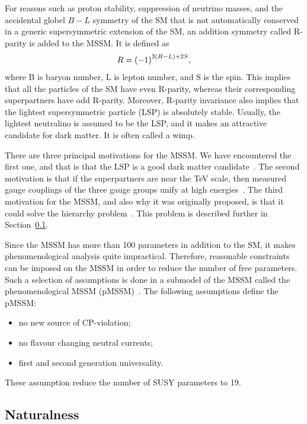 For reasons such as proton stability, suppression of neutrino masses, and the accidental globel $B-L$ symmetry of the SM that is not automatically conserved in a generic supersymmetric extension of the SM, an addition symmetry called R-parity is added to the MSSM. It is defined as
\begin{equation}
R=\qty(-1)^{3(B-L)+2S},
\end{equation}
where B is baryon number, L is lepton number, and S is the spin. This implies that all the particles of the SM have even R-parity, whereas their corresponding superpartners have odd R-parity. Moreover,
R-parity invariance also implies that the lightest supersymmetric particle (LSP) is absolutely stable. Usually, the lightest neutralino is assumed to be the LSP, and it makes an attractive candidate for dark matter. It is often called a \gls{wimp}.

There are three principal motivations for the MSSM. We have encountered the first one, and that is that the LSP is a good dark matter candidate~\cite{Garrett_2011}. The second motivation is that if the superpartners are near the TeV scale, then measured gauge couplings of the three gauge groups unify at high energies~\cite{PhysRevD.24.1681}. The third motivation for the MSSM, and also why it was originally proposed, is that it could solve the hierarchy problem~\cite{DIMOPOULOS1981150}. This problem is described further in Section~\ref{sec:naturalness}.

Since the MSSM has more than 100 parameters in addition to the SM, it makes phenomenological analysis quite impractical. Therefore, reasonable constraints can be imposed on the MSSM in order to reduce the number of free parameters. Such a selection of assumptions is done in a submodel of the MSSM called the phenomenological MSSM (pMSSM)~\cite{djouadi1999minimal,Berger_2009}. The following assumptions define the pMSSM:
\begin{itemize}
\item no new source of CP-violation;
\item no flavour changing neutral currents;
\item first and second generation universality.
\end{itemize}
These assumption reduce the number of SUSY parameters to 19.


\subsection{Naturalness}
\label{sec:naturalness}


